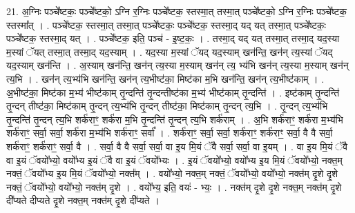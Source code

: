 \documentclass[17pt]{extarticle}
\begin{document}
21. अ॒ग्निः पञ्चे᳚ष्टकः॒ पञ्चे᳚ष्टको॒ ऽग्नि र॒ग्निः पञ्चे᳚ष्टक॒ स्तस्मा॒त् तस्मा॒त् पञ्चे᳚ष्टको॒ ऽग्नि र॒ग्निः पञ्चे᳚ष्टक॒ स्तस्मा᳚त् । . पञ्चे᳚ष्टक॒ स्तस्मा॒त् तस्मा॒त् पञ्चे᳚ष्टकः॒ पञ्चे᳚ष्टक॒ स्तस्मा॒द् यद् यत् तस्मा॒त् पञ्चे᳚ष्टकः॒ पञ्चे᳚ष्टक॒ स्तस्मा॒द् यत् । . पञ्चे᳚ष्टक॒ इति॒ पञ्च॑ - इ॒ष्ट॒कः॒ । . तस्मा॒द् यद् यत् तस्मा॒त् तस्मा॒द् यद॒स्या म॒स्यां ॅयत् तस्मा॒त् तस्मा॒द् यद॒स्याम् । . यद॒स्या म॒स्यां ॅयद् यद॒स्याम् खन॑न्ति॒ खन॑न् त्य॒स्यां ॅयद् यद॒स्याम् खन॑न्ति । . अ॒स्याम् खन॑न्ति॒ खन॑न् त्य॒स्या म॒स्याम् खन॑न् त्य॒ भ्य॑भि खन॑न् त्य॒स्या म॒स्याम् खन॑न् त्य॒भि । . खन॑न् त्य॒भ्य॑भि खन॑न्ति॒ खन॑न् त्य॒भीष्ट॑का॒ मिष्ट॑का म॒भि खन॑न्ति॒ खन॑न् त्य॒भीष्ट॑काम् । . अ॒भीष्ट॑का॒ मिष्ट॑का म॒भ्य॑ भीष्ट॑काम् तृ॒न्दन्ति॑ तृ॒न्दन्तीष्ट॑का म॒भ्य॑ भीष्ट॑काम् तृ॒न्दन्ति॑ । . इष्ट॑काम् तृ॒न्दन्ति॑ तृ॒न्दन् तीष्ट॑का॒ मिष्ट॑काम् तृ॒न्दन् त्य॒भ्य॑भि तृ॒न्दन् तीष्ट॑का॒ मिष्ट॑काम् तृ॒न्दन् त्य॒भि । . तृ॒न्दन् त्य॒भ्य॑भि तृ॒न्दन्ति॑ तृ॒न्दन् त्य॒भि शर्क॑राꣳ॒॒ शर्क॑रा म॒भि तृ॒न्दन्ति॑ तृ॒न्दन् त्य॒भि शर्क॑राम् । . अ॒भि शर्क॑राꣳ॒॒ शर्क॑रा म॒भ्य॑भि शर्क॑राꣳ॒॒ सर्वा॒ सर्वा॒ शर्क॑रा म॒भ्य॑भि शर्क॑राꣳ॒॒ सर्वा᳚ । . शर्क॑राꣳ॒॒ सर्वा॒ सर्वा॒ शर्क॑राꣳ॒॒ शर्क॑राꣳ॒॒ सर्वा॒ वै वै सर्वा॒ शर्क॑राꣳ॒॒ शर्क॑राꣳ॒॒ सर्वा॒ वै । . सर्वा॒ वै वै सर्वा॒ सर्वा॒ वा इ॒य मि॒यं ॅवै सर्वा॒ सर्वा॒ वा इ॒यम् । . वा इ॒य मि॒यं ॅवै वा इ॒यं ॅवयो᳚भ्यो॒ वयो᳚भ्य इ॒यं ॅवै वा इ॒यं ॅवयो᳚भ्यः । . इ॒यं ॅवयो᳚भ्यो॒ वयो᳚भ्य इ॒य मि॒यं ॅवयो᳚भ्यो॒ नक्त॒म् नक्तं॒ ॅवयो᳚भ्य इ॒य मि॒यं ॅवयो᳚भ्यो॒ नक्त᳚म् । . वयो᳚भ्यो॒ नक्त॒म् नक्तं॒ ॅवयो᳚भ्यो॒ वयो᳚भ्यो॒ नक्त॑म् दृ॒शे दृ॒शे नक्तं॒ ॅवयो᳚भ्यो॒ वयो᳚भ्यो॒ नक्त॑म् दृ॒शे । . वयो᳚भ्य॒ इति॒ वयः॑ - भ्यः॒ । . नक्त॑म् दृ॒शे दृ॒शे नक्त॒म् नक्त॑म् दृ॒शे दी᳚प्यते दीप्यते दृ॒शे नक्त॒म् नक्त॑म् दृ॒शे दी᳚प्यते । \newline
\end{document}

